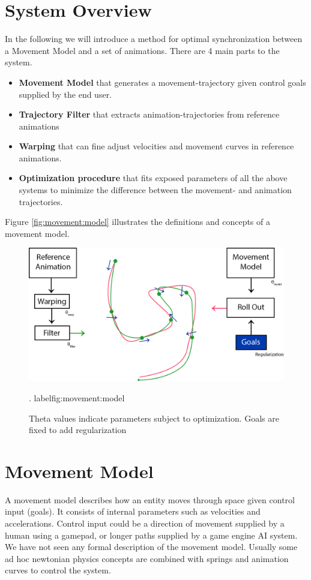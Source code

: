 \section{System Overview}
In the following we will introduce a method for optimal synchronization between a Movement Model and a set of animations. There are 4 main parts to the system. 
\begin{itemize}
    \item \textbf{Movement Model} that generates a movement-trajectory given control goals supplied by the end user.
    \item \textbf{Trajectory Filter} that extracts animation-trajectories from reference animations 
    \item \textbf{Warping} that can fine adjust velocities and movement curves in reference animations.
    \item \textbf{Optimization procedure} that fits exposed parameters of all the above systems to minimize the difference between the movement- and animation trajectories.
\end{itemize}
Figure \ref{fig:movement:model} illustrates the definitions and concepts of a movement model.
\begin{figure}
    \centering
    \includegraphics[width=0.75\columnwidth]{img/method-overview.png}
    \caption{Theta values indicate parameters subject to optimization. Goals are fixed to add regularization}.
    label{fig:movement:model}
\end{figure}

\section{Movement Model}
A movement model describes how an entity moves through space given control input (goals). It consists of internal parameters such as velocities and accelerations. Control input could be a direction of movement supplied by a human using a gamepad, or longer paths supplied by a game engine AI system. We have not seen any formal description of the movement model. Usually some ad hoc newtonian physics concepts are combined with springs and animation curves to control the system.

